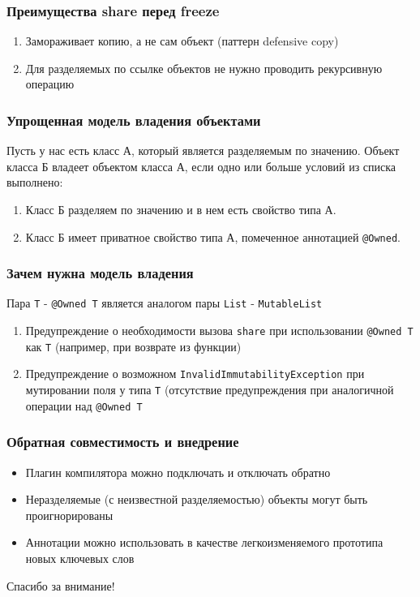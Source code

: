 \documentclass[14pt,xcolor={dvipsnames}]{beamer}
\begin{document}
\begin{frame}
\frametitle{Преимущества share перед freeze}
\begin{enumerate}
	\item Замораживает копию, а не сам объект (паттерн defensive copy)
	\item Для разделяемых по ссылке объектов не нужно проводить рекурсивную операцию
\end{enumerate}	
\end{frame}

\begin{frame}
\frametitle{Упрощенная модель владения объектами}
Пусть у нас есть класс А, который является разделяемым по значению.
Объект класса Б владеет объектом класса А, если одно или больше условий из списка выполнено:

\begin{enumerate}
	\item Класс Б разделяем по значению и в нем есть свойство типа А.
	\item Класс Б имеет приватное свойство типа А, помеченное аннотацией \texttt{@Owned}.
\end{enumerate}
\end{frame}

\begin{frame}
\frametitle{Зачем нужна модель владения}
Пара \texttt{T} - \texttt{@Owned T} является аналогом пары \texttt{List} - \texttt{MutableList}

\begin{enumerate}
	\item Предупреждение о необходимости вызова \texttt{share} при использовании \texttt{@Owned T} как \texttt{T} (например, при возврате из функции)
	\item Предупреждение о возможном \texttt{InvalidImmutabilityException} при мутировании поля у типа \texttt{T} (отсутствие предупреждения при аналогичной операции над \texttt{@Owned T}
\end{enumerate}
\end{frame}

\begin{frame}
\frametitle{Обратная совместимость и внедрение}
\begin{itemize}
  \item Плагин компилятора можно подключать и отключать обратно
  \item Неразделяемые (с неизвестной разделяемостью) объекты могут быть проигнорированы
  \item Аннотации можно использовать в качестве легкоизменяемого прототипа новых ключевых слов
\end{itemize}
\end{frame}

\begin{frame}
\begin{center}
Спасибо за внимание!
\end{center}
\end{frame}
\end{document}
